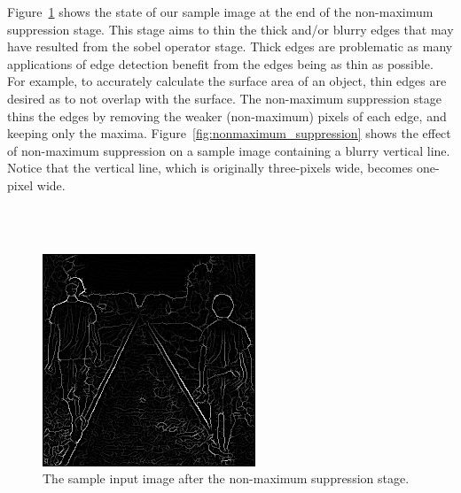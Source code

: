 \documentclass[epsfig,10pt,fullpage]{article}
\begin{document}
\noindent
Figure~\ref{fig:sample_stage4} shows the state of our sample image at the end of the non-maximum suppression stage. This stage aims to thin the thick and/or blurry edges that may have resulted from the sobel operator stage. Thick edges are problematic as many applications of edge detection benefit from the edges being as thin as possible. For example, to accurately calculate the surface area of an object, thin edges are desired as to not overlap with the surface. The non-maximum suppression stage thins the edges by removing the weaker (non-maximum) pixels of each edge, and keeping only the maxima. Figure~\ref{fig:nonmaximum_suppression} shows the effect of non-maximum suppression on a sample image containing a blurry vertical line. Notice that the vertical line, which is originally three-pixels wide, becomes one-pixel wide.  

~\\
~\\
\begin{figure}[H]
   \begin{center}
       \includegraphics[scale = 0.85]{figures/fig_stage4_nonmax_suppression.png}
   \end{center}
   \caption{The sample input image after the non-maximum suppression stage.}
	\label{fig:sample_stage4}
\end{figure}
\end{document}
